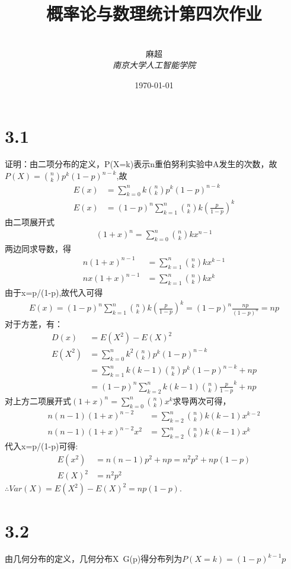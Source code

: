 \documentclass[12pt,a4paper,fontset=none]{ctexart}
\title{\textbf{概率论与数理统计第四次作业}}
\author{
\\
\Large{麻超 \quad 201300066}
\\[6pt]
{ \large \textit{南京大学人工智能学院}}\\[2pt]
}
\date{\today}
\begin{document}
\maketitle
\setcounter{page}{1}

\section*{3.1}
证明：由二项分布的定义，P(X=k)表示n重伯努利实验中A发生的次数，故$P(X)=\binom{n}{k}p^k(1-p)^{n-k}$,故
\begin{align*}
	E(x) & =\sum_{k=0}^nk\binom{n}{k}p^k(1-p)^{n-k}           \\
	E(x) & =(1-p)^n\sum_{k=1}^n\binom{n}{k}k(\frac{p}{1-p})^k
\end{align*}
由二项展开式
\begin{align*}
	(1+x)^n=\sum_{k=0}^n\binom{n}{k}kx^{n-1}
\end{align*}
两边同求导数，得
\begin{align*}
	n(1+x)^{n-1}  & =\sum_{k=1}^n\binom{n}{k}kx^{k-1} \\
	nx(1+x)^{n-1} & =\sum_{k=1}^n\binom{n}{k}kx^k
\end{align*}
由于x=p/(1-p),故代入可得
\begin{align*}
	E(x)=(1-p)^n\sum_{k=1}^n\binom{n}{k}k(\frac{p}{1-p})^k=(1-p)^n\frac{np}{(1-p)^n}=np
\end{align*}
对于方差，有：
\begin{align*}
	D(x)   & =E(X^2)-E(X)^2                             \\
	E(X^2) & =\sum_{k=0}^nk^2\binom{n}{k}p^k(1-p)^{n-k}
	\\ &=\sum_{k=1}^nk(k-1)\binom{n}{k}p^k(1-p)^{n-k}+np
	\\ &=(1-p)^n\sum_{k=2}^nk(k-1)\binom{n}{k}\frac{p}{1-p}^k+np
\end{align*}
对上方二项展开式$(1+x)^n=\sum_{k=0}^n\binom{n}{k}x^k$求导两次可得，
\begin{align*}
	n(n-1)(1+x)^{n-2}    & =\sum_{k=2}^n\binom{n}{k}k(k-1)x^{k-2} \\
	n(n-1)(1+x)^{n-2}x^2 & =\sum_{k=2}^n\binom{n}{k}k(k-1)x^k
\end{align*}
代入x=p/(1-p)可得:
\begin{align*}
	E(x^2) & =n(n-1)p^2+np=n^2p^2+np(1-p) \\
	E(X)^2 & =n^2p^2
\end{align*}
$\therefore Var(X)=E(X^2)-E(X)^2=np(1-p)$.
\section*{3.2}
由几何分布的定义，几何分布X~G(p)得分布列为$P(X=k)=(1-p)^{k-1}p$
\end{document}
